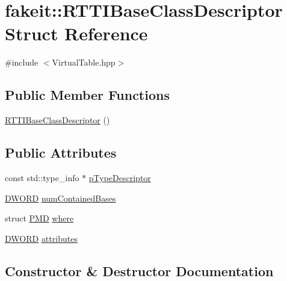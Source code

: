 \hypertarget{structfakeit_1_1RTTIBaseClassDescriptor}{}\section{fakeit\+::R\+T\+T\+I\+Base\+Class\+Descriptor Struct Reference}
\label{structfakeit_1_1RTTIBaseClassDescriptor}


{\ttfamily \#include $<$Virtual\+Table.\+hpp$>$}

\subsection*{Public Member Functions}
\begin{DoxyCompactItemize}
\item 
\mbox{\hyperlink{structfakeit_1_1RTTIBaseClassDescriptor_a40cc8f17c424ff6438b7888707965656}{R\+T\+T\+I\+Base\+Class\+Descriptor}} ()
\end{DoxyCompactItemize}
\subsection*{Public Attributes}
\begin{DoxyCompactItemize}
\item 
const std\+::type\+\_\+info $\ast$ \mbox{\hyperlink{structfakeit_1_1RTTIBaseClassDescriptor_a0658ec3201cdf90ff49bca1c3f9cb792}{p\+Type\+Descriptor}}
\item 
\mbox{\hyperlink{namespacefakeit_a3d9fcff73186d3a22472ec6156db1f10}{D\+W\+O\+RD}} \mbox{\hyperlink{structfakeit_1_1RTTIBaseClassDescriptor_a516a23b81585af9e733bd63869853296}{num\+Contained\+Bases}}
\item 
struct \mbox{\hyperlink{structfakeit_1_1PMD}{P\+MD}} \mbox{\hyperlink{structfakeit_1_1RTTIBaseClassDescriptor_abfe212c73a7876cd400180cf8326d353}{where}}
\item 
\mbox{\hyperlink{namespacefakeit_a3d9fcff73186d3a22472ec6156db1f10}{D\+W\+O\+RD}} \mbox{\hyperlink{structfakeit_1_1RTTIBaseClassDescriptor_ab8eac820c2c10556437b89b9e5a7092a}{attributes}}
\end{DoxyCompactItemize}


\subsection{Constructor \& Destructor Documentation}
\mbox{\label{structfakeit_1_1RTTIBaseClassDescriptor_a40cc8f17c424ff6438b7888707965656}} 
